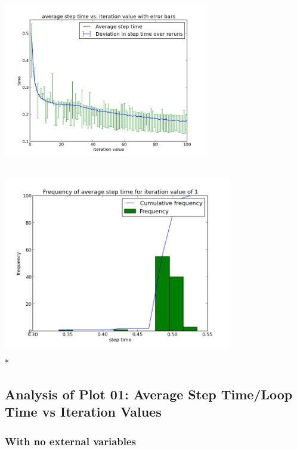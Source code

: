 \documentclass[11pt]{article}
\begin{document}
\subsubsection*{}
\includegraphics[height=8cm,width=9cm]{plots_doc/g10_plot04_re}
\includegraphics[height=8cm,width=10cm]{plots_doc/g10_plot05_re}
\\*
\subsection{Analysis of Plot 01: Average Step Time/Loop Time vs Iteration Values}

\subsubsection { With no external variables}
\end{document}
